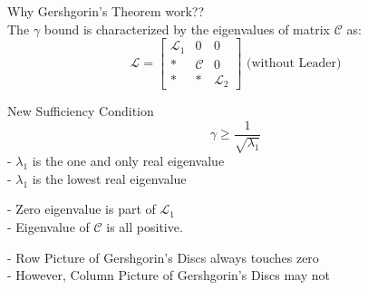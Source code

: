 \begin{subframe}{}
	Why Gershgorin's Theorem work??\\ 
	\pause
	The $\gamma$ bound is characterized by the eigenvalues of matrix $\mathcal{C}$ as:
	$$\mathcal{L}=\begin{bmatrix}
		\mathcal{L}_1 & 0 & 0 \\
		* & \mathcal{C} & 0 \\
		* & * & \mathcal{L}_2
	\end{bmatrix}\text{ (without Leader)}$$
	\vspace{-0.1cm}
	\begin{block}{New Sufficiency Condition}
		$$\gamma \geq \frac{1}{\sqrt{\lambda_1}}$$
		- $\lambda_1$ is the one and only real eigenvalue\\ 
		- $\lambda_1$ is the lowest real eigenvalue
	\end{block}
	\vspace{-0.1cm}
	\begin{exampleblock}{}
		- Zero eigenvalue is part of $\mathcal{L}_1$\\
		- Eigenvalue of $\mathcal{C}$ is all positive.
	\end{exampleblock}
	\vspace{-0.1cm}
	\begin{alertblock}{}
		- Row Picture of Gershgorin's Discs always touches zero\\
		- However, Column Picture of Gershgorin's Discs may not
	\end{alertblock}
	\hyperlink{Conc:Approach1}{}
\end{subframe}


